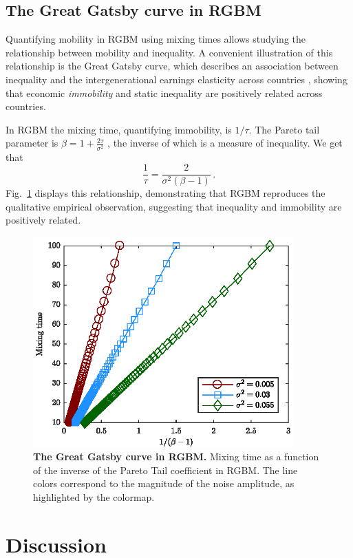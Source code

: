 \documentclass[11pt]{article}
\newcommand{\fref}[1]{Fig.~\ref{fig:#1}}
\newcommand{\be}{\begin{equation}}
\newcommand{\ee}{\end{equation}}
\numberwithin{equation}{section}
\begin{document}
\subsection{The Great Gatsby curve in RGBM}

Quantifying mobility in RGBM using mixing times allows studying the relationship between mobility and inequality. A convenient illustration of this relationship is the Great Gatsby curve, which describes an association between inequality and the intergenerational earnings elasticity across countries \citep{krueger2012,corak2013}, showing that economic \textit{immobility} and static inequality are positively related across countries.

In RGBM the mixing time, quantifying immobility, is $1/\tau$. The Pareto tail parameter is $\beta = 1 + \frac{2\tau}{\sigma^2}$ \citep{BermanPetersAdamou2019}, the inverse of which is a measure of inequality. We get that
%
\be
\frac{1}{\tau} = \frac{2}{\sigma^2\left(\beta - 1\right)}\,.
\ee
%
\fref{rgbm-great-gatsby} displays this relationship, demonstrating that RGBM reproduces the qualitative empirical observation, suggesting that inequality and immobility are positively related.

\begin{figure}[!htb]
\centering
\includegraphics[width=10cm]{figs/fig_great_gatsby.eps}
\caption{\textbf{The Great Gatsby curve in RGBM.} Mixing time as a function of the inverse of the Pareto Tail coefficient in RGBM. The line colors correspond to the magnitude of the noise amplitude, as highlighted by the colormap.
\label{fig:rgbm-great-gatsby}}
\end{figure}

\FloatBarrier

\section{Discussion} \label{sec:discussion}
\end{document}
